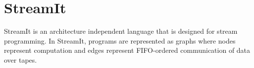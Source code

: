 \documentclass{sigplanconf}
\begin{document}
\section{StreamIt}
\label{sec:streamit}

StreamIt  is   an  architecture independent language that is
designed for  stream programming. In StreamIt, programs are
represented as graphs where  nodes represent  computation and edges
represent FIFO-ordered communication of data over tapes.
\end{document}
